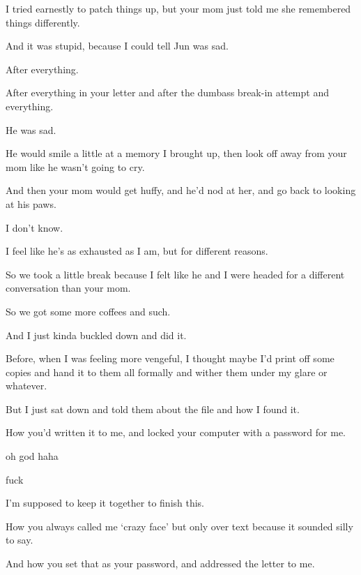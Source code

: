 { I tried earnestly to patch things up, but your mom just told me she remembered things differently.

 And it was stupid, because I could tell Jun was sad.

 After everything.

 After everything in your letter and after the dumbass break-in attempt and everything.

 He was sad.

 He would smile a little at a memory I brought up, then look off away from your mom like he wasn't going to cry.

 And then your mom would get huffy, and he'd nod at her, and go back to looking at his paws.

 I don't know.

 I feel like he's as exhausted as I am, but for different reasons.

 So we took a little break because I felt like he and I were headed for a different conversation than your mom.

 So we got some more coffees and such.

 And I just kinda buckled down and did it.

 Before, when I was feeling more vengeful, I thought maybe I'd print off some copies and hand it to them all formally and wither them under my glare or whatever.

 But I just sat down and told them about the file and how I found it.

 How you'd written it to me, and locked your computer with a password for me.

 oh god haha

 fuck

 I'm supposed to keep it together to finish this.

 How you always called me `crazy face' but only over text because it sounded silly to say.

 And how you set that as your password, and addressed the letter to me.

}
